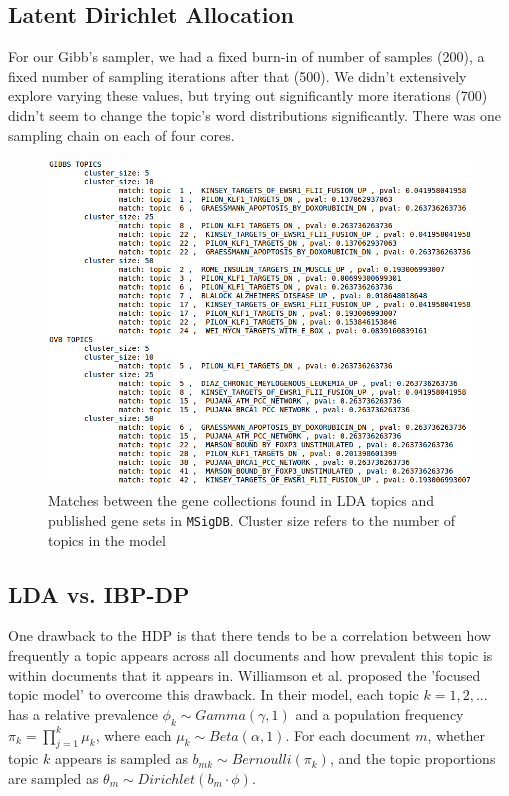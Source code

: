\documentclass{article}
\begin{document}
\subsection{Latent Dirichlet Allocation}
\label{ldaappendix}
For our Gibb's sampler, we had a fixed burn-in of number of samples (200), a fixed number of sampling iterations after that (500). We didn't extensively explore varying these values, but trying out significantly more iterations (700) didn't seem to change the topic's word distributions significantly. There was one sampling chain on each of four cores.

\begin{figure}
    \centering
    \includegraphics[width=1\textwidth]{figs/pathways}
    \caption{Matches between the gene collections found in LDA topics and published gene sets in \texttt{MSigDB}. Cluster size refers to the number of topics in the model}
    \label{fig:pathways}
\end{figure}

\subsection{LDA vs. IBP-DP}
One drawback to the HDP is that there tends to be a correlation between how frequently a topic appears across all documents and how prevalent this topic is within documents that it appears in. Williamson et al. \cite{IBP} proposed the 'focused topic model' to overcome this drawback. In their model, each topic $k = 1,2,...$ has a relative prevalence $\phi_k \sim Gamma(\gamma, 1)$ and a population frequency $\pi_k = \prod^k_{j=1} \mu_k$, where each $\mu_k \sim Beta(\alpha, 1) $. For each document $m$, whether topic $k$ appears is sampled as $b_{mk} \sim Bernoulli(\pi_k)$, and the topic proportions are sampled as $\theta_m \sim Dirichlet(b_m \cdot \phi)$. \\
\end{document}
